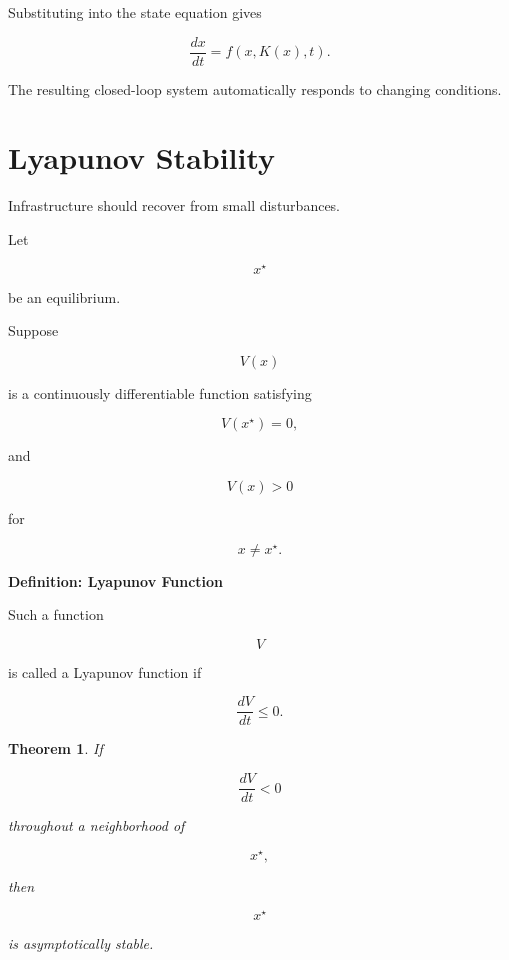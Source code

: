 \documentclass[11pt,fleqn]{book}
\numberwithin{equation}{chapter}
\newenvironment{definition}[1]
  {\begin{definitionEnv}
   \noindent\textbf{Definition: #1}\par\smallskip}
  {\end{definitionEnv}}
\theoremstyle{plain}
\newtheorem{theorem}{Theorem}[chapter]
\theoremstyle{definition}
\theoremstyle{remark}
\begin{document}
Substituting into the state equation gives

\[
\frac{dx}{dt}
=
f(x,K(x),t).
\]

The resulting closed-loop system automatically responds to changing
conditions.


\section{Lyapunov Stability}

Infrastructure should recover from small disturbances.

Let

\[
x^\star
\]

be an equilibrium.

Suppose

\[
V(x)
\]

is a continuously differentiable function satisfying

\[
V(x^\star)=0,
\]

and

\[
V(x)>0
\]

for

\[
x\neq x^\star.
\]


\begin{definition}{Lyapunov Function}

Such a function

\[
V
\]

is called a Lyapunov function if

\[
\frac{dV}{dt}
\le0.
\]

\end{definition}


\begin{theorem}

If

\[
\frac{dV}{dt}<0
\]

throughout a neighborhood of

\[
x^\star,
\]

then

\[
x^\star
\]

is asymptotically stable.

\end{theorem}
\end{document}
